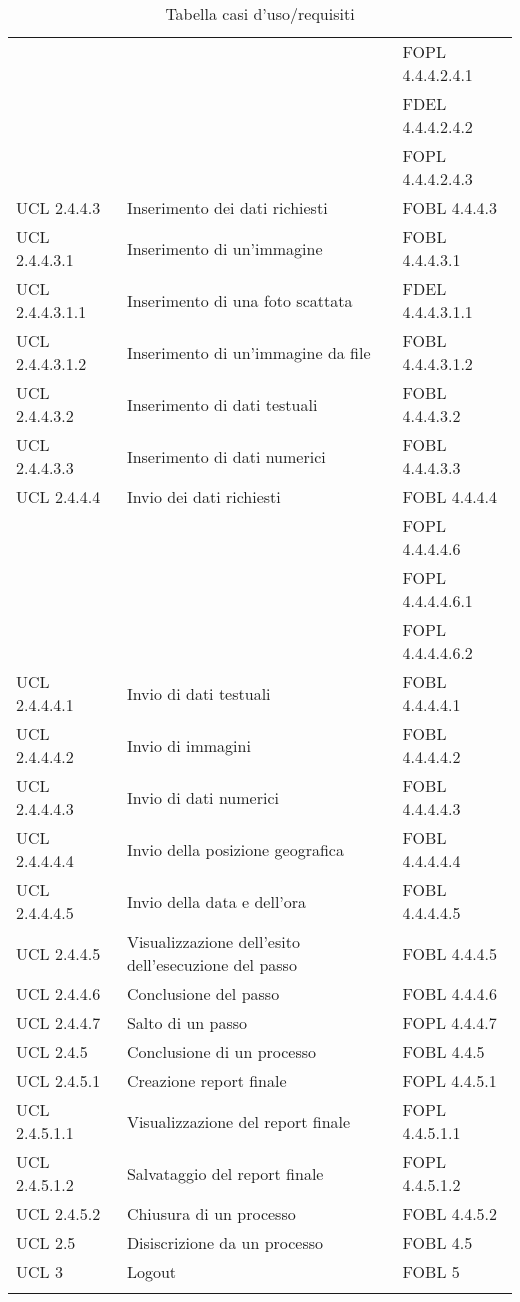 \begin{longtable}{lXp{}}
&&FOPL 4.4.4.2.4.1\\ 
&&FDEL 4.4.4.2.4.2\\ 
&&FOPL 4.4.4.2.4.3\\ 
\midrule 
UCL 2.4.4.3&Inserimento dei dati richiesti&FOBL 4.4.4.3\\ 
\midrule 
UCL 2.4.4.3.1&Inserimento di un'immagine&FOBL 4.4.4.3.1\\ 
\midrule 
UCL 2.4.4.3.1.1&Inserimento di una foto scattata&FDEL 4.4.4.3.1.1\\ 
\midrule 
UCL 2.4.4.3.1.2&Inserimento di un'immagine da file&FOBL 4.4.4.3.1.2\\ 
\midrule 
UCL 2.4.4.3.2&Inserimento di dati testuali&FOBL 4.4.4.3.2\\ 
\midrule 
UCL 2.4.4.3.3&Inserimento di dati numerici&FOBL 4.4.4.3.3\\ 
\midrule 
UCL 2.4.4.4&Invio dei dati richiesti&FOBL 4.4.4.4\\
&&FOPL 4.4.4.4.6\\
&&FOPL 4.4.4.4.6.1\\
&&FOPL 4.4.4.4.6.2\\
\midrule 
UCL 2.4.4.4.1&Invio di dati testuali&FOBL 4.4.4.4.1\\ 
\midrule 
UCL 2.4.4.4.2&Invio di immagini&FOBL 4.4.4.4.2\\ 
\midrule 
UCL 2.4.4.4.3&Invio di dati numerici&FOBL 4.4.4.4.3\\
\midrule
UCL 2.4.4.4.4&Invio della posizione geografica&FOBL 4.4.4.4.4\\ 
\midrule 
UCL 2.4.4.4.5&Invio della data e dell'ora&FOBL 4.4.4.4.5\\
\midrule 
UCL 2.4.4.5&Visualizzazione dell'esito dell'esecuzione del passo&FOBL 4.4.4.5\\ 
\midrule 
UCL 2.4.4.6&Conclusione del passo&FOBL 4.4.4.6\\ 
\midrule 
UCL 2.4.4.7&Salto di un passo&FOPL 4.4.4.7\\ 
\midrule 
UCL 2.4.5&Conclusione di un processo&FOBL 4.4.5\\
\midrule
UCL 2.4.5.1&Creazione report finale&FOPL 4.4.5.1\\ 
\midrule 
UCL 2.4.5.1.1&Visualizzazione del report finale&FOPL 4.4.5.1.1\\ 
\midrule 
UCL 2.4.5.1.2&Salvataggio del report finale&FOPL 4.4.5.1.2\\ 
\midrule 
UCL 2.4.5.2&Chiusura di un processo&FOBL 4.4.5.2\\ 
\midrule 
UCL 2.5&Disiscrizione da un processo&FOBL 4.5\\ 
\midrule 
UCL 3&Logout&FOBL 5\\ 
\bottomrule
\caption{Tabella casi d'uso/requisiti}
\end{longtable} 